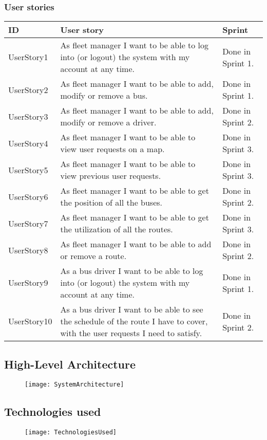 \subsubsection{User stories}
\begin{table}[H]
	\centering
	\begin{tabular}{| m{2.2cm} | m{6cm} | m{3.8cm} |}
		\hline
		\textbf{ID} & \textbf{User story} & \textbf{Sprint} \\
		\hline
		UserStory1 & As fleet manager I want to be able to log into (or logout) the system with my account at any time. & Done in Sprint 1.\\
		\hline
		UserStory2 & As fleet manager I want to be able to add, modify or remove a bus. & Done in Sprint 1.\\
		\hline
		UserStory3 & As fleet manager I want to be able to add, modify or remove a driver. & Done in Sprint 2.\\
		\hline
		UserStory4 & As fleet manager I want to be able to view user requests on a map. & Done in Sprint 3.\\
		\hline
		UserStory5 & As fleet manager I want to be able to view previous user requests. & Done in Sprint 3.\\
		\hline
		UserStory6 & As fleet manager I want to be able to get the position of all the buses. & Done in Sprint 2.\\
		\hline
		UserStory7 & As fleet manager I want to be able to get the utilization of all the routes. & Done in Sprint 3.\\
		\hline
		UserStory8 & As fleet manager I want to be able to add or remove a route. & Done in Sprint 2.\\
		\hline
		UserStory9 & As a bus driver I want to be able to log into (or logout) the system with my account at any time. & Done in Sprint 1.\\
		\hline
		UserStory10 & As a bus driver I want to be able to see the schedule of the route I have to cover, with the user requests I need to satisfy. & Done in Sprint 2.\\
		\hline
	\end{tabular}
\end{table}

\subsection{High-Level Architecture}
\begin{figure}[H]
	\centering
	\texttt{[image: SystemArchitecture]}
\end{figure}

\subsection{Technologies used}
\begin{figure}[H]
	\centering
	\texttt{[image: TechnologiesUsed]}
\end{figure}